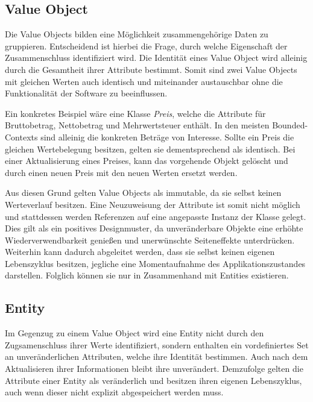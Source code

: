 \subsection{Value Object}

Die Value Objects bilden eine Möglichkeit zusammengehörige Daten zu gruppieren. Entscheidend ist hierbei die Frage, durch welche Eigenschaft der Zusammenschluss identifiziert wird. Die Identität eines Value Object wird alleinig durch die Gesamtheit ihrer Attribute bestimmt. Somit sind zwei Value Objects mit gleichen Werten auch identisch und miteinander austauschbar ohne die Funktionalität der Software zu beeinflussen. 

Ein konkretes Beispiel wäre eine Klasse \emph{Preis}, welche die Attribute für Bruttobetrag, Nettobetrag und Mehrwertsteuer enthält. In den meisten Bounded-Contexts sind alleinig die konkreten Beträge von Interesse. Sollte ein Preis die gleichen Wertebelegung besitzen, gelten sie dementsprechend als identisch. Bei einer Aktualisierung eines Preises, kann das vorgehende Objekt gelöscht und durch einen neuen Preis mit den neuen Werten ersetzt werden. 

Aus diesen Grund gelten Value Objects als \gls{immutable}, da sie selbst keinen Werteverlauf besitzen. Eine Neuzuweisung der Attribute ist somit nicht möglich und stattdessen werden Referenzen auf eine angepasste Instanz der Klasse gelegt. Dies gilt als ein positives Designmuster, da unveränderbare Objekte eine erhöhte Wiederverwendbarkeit genießen und unerwünschte Seiteneffekte unterdrücken. Weiterhin kann dadurch abgeleitet werden, dass sie selbst keinen eigenen Lebenszyklus besitzen, jegliche eine Momentaufnahme des Applikationszustandes darstellen. Folglich können sie nur in Zusammenhand mit Entities existieren.

\subsection{Entity}

Im Gegenzug zu einem Value Object wird eine Entity nicht durch den Zugsamenschluss ihrer Werte identifiziert, sondern enthalten ein vordefiniertes Set an unveränderlichen Attributen, welche ihre Identität bestimmen. Auch nach dem Aktualisieren ihrer Informationen bleibt ihre  unverändert. Demzufolge gelten die Attribute einer Entity als veränderlich und besitzen ihren eigenen Lebenszyklus, auch wenn dieser nicht explizit abgespeichert werden muss.

